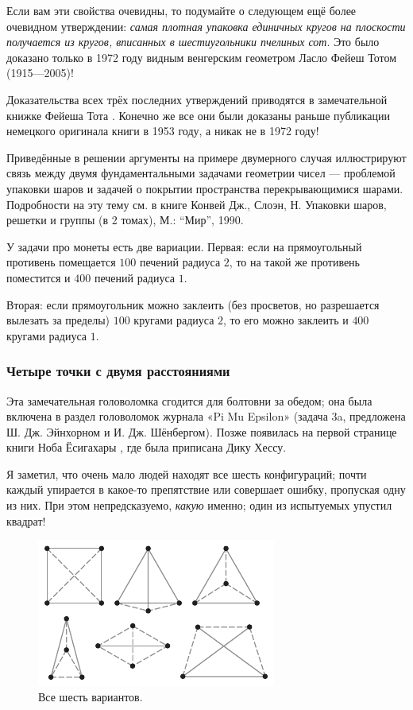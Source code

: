Если вам эти свойства очевидны, то подумайте о следующем ещё более очевидном утверждении: \emph{самая плотная упаковка единичных кругов на  плоскости получается из кругов, вписанных в шестиугольники пчелиных сот}.
Это было доказано только в 1972 году видным венгерским геометром Ласло Фейеш Тотом (1915---2005)!

\begin{addedbytheeditors}
Доказательства всех трёх последних утверждений приводятся в замечательной книжке Фейеша Тота \cite[III §3]{tot}.
Конечно же все они были доказаны раньше публикации немецкого оригинала книги в 1953 году, а никак не в 1972 году!

Приведённые в решении аргументы на примере двумерного случая иллюстрируют связь между двумя фундаментальными задачами геометрии чисел --- проблемой упаковки шаров и задачей о покрытии пространства перекрывающимися шарами. Подробности на эту тему см. в книге Конвей Дж.,  Слоэн, Н. Упаковки шаров, решетки и группы (в 2 томах), М.: ``Мир'', 1990. 

У задачи про монеты есть две вариации. Первая: если на прямоугольный противень помещается $100$ печений радиуса $2$, то  на такой же противень поместится и $400$ печений радиуса $1$.

Вторая: если прямоугольник можно заклеить (без просветов, но разрешается вылезать за пределы) $100$ кругами радиуса $2$, то его можно заклеить и $400$ кругами радиуса $1$.
\pr
\end{addedbytheeditors}

\subsubsection*{Четыре точки с двумя расстояниями}

Эта замечательная головоломка сгодится для болтовни за обедом;
она была включена в раздел головоломок журнала «Pi Mu Epsilon» \cite[1985 год]{16} (задача 3a, предложена Ш. Дж. Эйнхорном и И. Дж. Шёнбергом).
Позже появилась на первой странице книги Ноба Ёсигахары \cite{61}, где была приписана Дику Хессу.

Я заметил, что очень мало людей находят все шесть конфигураций;
почти каждый упирается в какое-то препятствие или совершает ошибку, пропуская одну из них.
При этом непредсказуемо, \emph{какую} именно; один из испытуемых упустил квадрат!

\begin{figure}[h!]
\centering
\includegraphics[scale=1]{pics/2dist}
\caption{Все шесть вариантов.}
\label{pic:2dist}
\end{figure}

